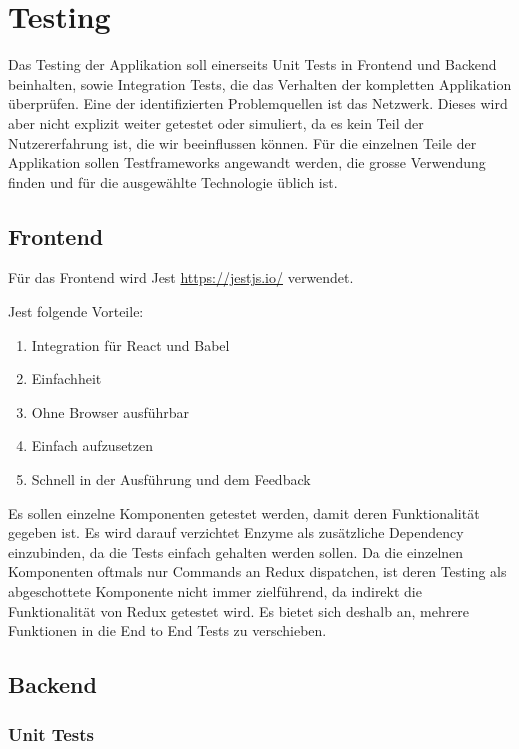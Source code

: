 \section{Testing}

Das Testing der Applikation soll einerseits Unit Tests in Frontend und Backend beinhalten, sowie Integration Tests, die das Verhalten der kompletten Applikation \"uberpr\"ufen.
Eine der identifizierten Problemquellen ist das Netzwerk.
Dieses wird aber nicht explizit weiter getestet oder simuliert, da es kein Teil der Nutzererfahrung ist, die wir beeinflussen k\"onnen.
F\"ur die einzelnen Teile der Applikation sollen Testframeworks angewandt werden, die grosse Verwendung finden und f\"ur die ausgew\"ahlte Technologie \"ublich ist.

\subsection{Frontend}
F\"ur das Frontend wird Jest \url{https://jestjs.io/} verwendet.

Jest folgende Vorteile:

\begin{enumerate}
    \item Integration f\"ur React und Babel
    \item Einfachheit
    \item Ohne Browser ausf\"uhrbar
    \item Einfach aufzusetzen
    \item Schnell in der Ausf\"uhrung und dem Feedback
\end{enumerate}

Es sollen einzelne Komponenten getestet werden, damit deren Funktionalit\"at gegeben ist.
Es wird darauf verzichtet Enzyme als zus\"atzliche Dependency einzubinden, da die Tests einfach gehalten werden sollen.
Da die einzelnen Komponenten oftmals nur Commands an Redux dispatchen, ist deren Testing als abgeschottete Komponente nicht immer zielf\"uhrend, da indirekt die Funktionalit\"at von Redux getestet wird.
Es bietet sich deshalb an, mehrere Funktionen in die End to End Tests zu verschieben.

\subsection{Backend}

\subsubsection{Unit Tests}

